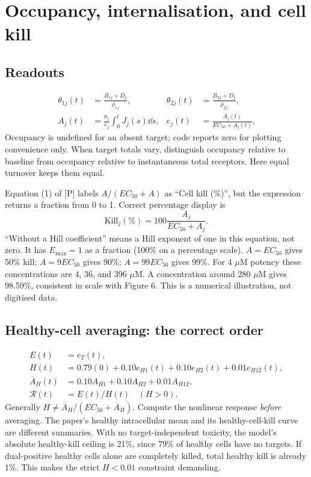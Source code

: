 \documentclass[11pt,a4paper]{article}
\begin{document}
\section{Occupancy, internalisation, and cell kill}
\subsection{Readouts}
\begin{align}
 \theta_{1j}(t)&=\frac{B_{1j}+D_j}{\rho_{1j}},&
 \theta_{2j}(t)&=\frac{B_{2j}+D_j}{\rho_{2j}},\\
 A_j(t)&=\frac{a_j}{v_j}\int_0^t J_j(s)\dd s,&
 e_j(t)&=\frac{A_j(t)}{EC_{50}+A_j(t)}.
\end{align}
Occupancy is undefined for an absent target; code reports zero for plotting convenience only. When target totals vary, distinguish occupancy relative to baseline from occupancy relative to instantaneous total receptors. Here equal turnover keeps them equal.

Equation (1) of [P] labels $A/(EC_{50}+A)$ as ``Cell kill (\%)'', but the expression returns a fraction from 0 to 1. Correct percentage display is
\begin{equation}\boxed{\mathrm{Kill}_j(\%)=100\frac{A_j}{EC_{50}+A_j}.}\end{equation}
``Without a Hill coefficient'' means a Hill exponent of one in this equation, not zero. It has $E_{\max}=1$ as a fraction (100\% on a percentage scale). $A=EC_{50}$ gives 50\% kill; $A=9EC_{50}$ gives 90\%; $A=99EC_{50}$ gives 99\%. For 4 $\mu$M potency these concentrations are 4, 36, and 396 $\mu$M. A concentration around 280 $\mu$M gives 98.59\%, consistent in scale with Figure 6. This is a numerical illustration, not digitised data.

\subsection{Healthy-cell averaging: the correct order}
\begin{align}
 E(t)&=e_T(t),\\
 H(t)&=0.79(0)+0.10e_{H1}(t)+0.10e_{H2}(t)+0.01e_{H12}(t),\\
 \overline A_H(t)&=0.10A_{H1}+0.10A_{H2}+0.01A_{H12},\\
 \mathcal R(t)&=E(t)/H(t)\quad(H>0).
\end{align}
Generally $H\ne\overline A_H/(EC_{50}+\overline A_H)$. Compute the nonlinear response \emph{before} averaging. The paper's healthy intracellular mean and its healthy-cell-kill curve are different summaries. With no target-independent toxicity, the model's absolute healthy-kill ceiling is 21\%, since 79\% of healthy cells have no targets. If dual-positive healthy cells alone are completely killed, total healthy kill is already 1\%. This makes the strict $H<0.01$ constraint demanding.
\end{document}
